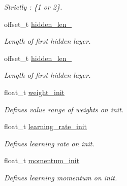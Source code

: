 \begin{DoxyCompactItemize}
\begin{DoxyCompactList}\small\item\em Strictly \-: \{1 or 2\}. \end{DoxyCompactList}\item 
\hypertarget{struct_n_a_r_x_config_a8a38012ca4422f62008ad05da77b382f}{offset\-\_\-t \hyperlink{struct_n_a_r_x_config_a8a38012ca4422f62008ad05da77b382f}{hidden\-\_\-len\-\_}}\label{struct_n_a_r_x_config_a8a38012ca4422f62008ad05da77b382f}

\begin{DoxyCompactList}\small\item\em Length of first hidden layer. \end{DoxyCompactList}\item 
\hypertarget{struct_n_a_r_x_config_a34fc9269581d504ba0716c82c2691539}{offset\-\_\-t \hyperlink{struct_n_a_r_x_config_a34fc9269581d504ba0716c82c2691539}{hidden\-\_\-len\-\_}}\label{struct_n_a_r_x_config_a34fc9269581d504ba0716c82c2691539}

\begin{DoxyCompactList}\small\item\em Length of first hidden layer. \end{DoxyCompactList}\item 
\hypertarget{struct_n_a_r_x_config_a574116e6baecef6f3d011f2838fa5f2d}{float\-\_\-t \hyperlink{struct_n_a_r_x_config_a574116e6baecef6f3d011f2838fa5f2d}{weight\-\_\-init}}\label{struct_n_a_r_x_config_a574116e6baecef6f3d011f2838fa5f2d}

\begin{DoxyCompactList}\small\item\em Defines value range of weights on init. \end{DoxyCompactList}\item 
\hypertarget{struct_n_a_r_x_config_afab32104552870cd8e59c973cdea87c1}{float\-\_\-t \hyperlink{struct_n_a_r_x_config_afab32104552870cd8e59c973cdea87c1}{learning\-\_\-rate\-\_\-init}}\label{struct_n_a_r_x_config_afab32104552870cd8e59c973cdea87c1}

\begin{DoxyCompactList}\small\item\em Defines learning rate on init. \end{DoxyCompactList}\item 
\hypertarget{struct_n_a_r_x_config_af0770f07391fa49b8e0bcfce44876fe6}{float\-\_\-t \hyperlink{struct_n_a_r_x_config_af0770f07391fa49b8e0bcfce44876fe6}{momentum\-\_\-init}}\label{struct_n_a_r_x_config_af0770f07391fa49b8e0bcfce44876fe6}

\begin{DoxyCompactList}\small\item\em Defines learning momentum on init. \end{DoxyCompactList}\end{DoxyCompactItemize}


